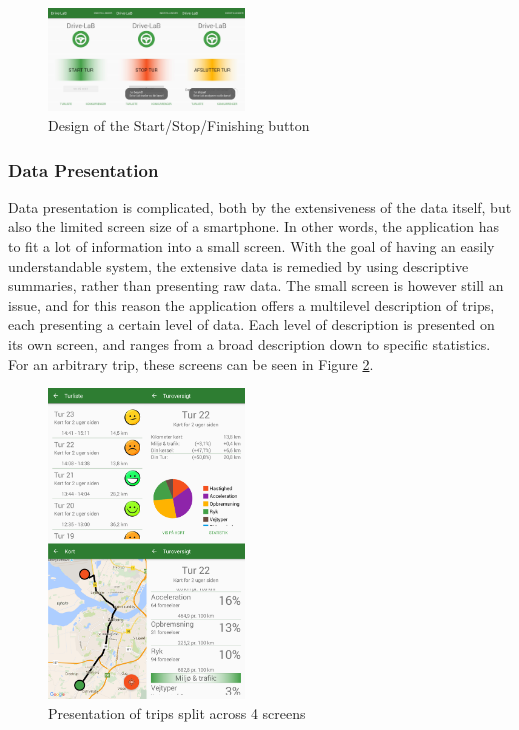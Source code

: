 \begin{figure}[tb]
\centering
\includegraphics[width=0.465\textwidth]{Pictures/start_stop_finishing_trip}
\caption{Design of the Start/Stop/Finishing button}
\label{fig:start_stop_finishing_trip}
\end{figure}

\subsubsection{Data Presentation} \label{subsubsec:design_datapresentation}
Data presentation is complicated, both by the extensiveness of the data itself, but also the limited screen size of a smartphone. In other words, the application has to fit a lot of information into a small screen. With the goal of having an easily understandable system, the extensive data is remedied by using descriptive summaries, rather than presenting raw data. The small screen is however still an issue, and for this reason the application offers a multilevel description of trips, each presenting a certain level of data. Each level of description is presented on its own screen, and ranges from a broad description down to specific statistics. For an arbitrary trip, these screens can be seen in Figure \ref{fig:tripoverview}.

\begin{figure}[tb]
\centering
\includegraphics[width=0.465\textwidth]{Pictures/tripoverview}
\caption{Presentation of trips split across 4 screens}
\label{fig:tripoverview}
\end{figure}

